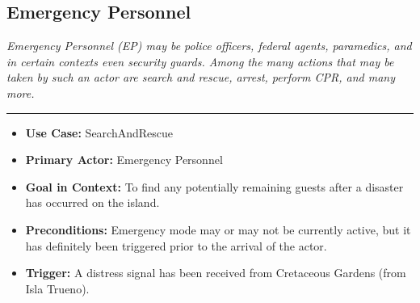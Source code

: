 \documentclass[12pt]{article}
\begin{document}
    \subsection{Emergency Personnel}
    \textit{Emergency Personnel (EP) may be police officers, federal agents, paramedics, and in certain contexts even 
    security guards. Among the many actions that may be taken by such an actor are search and rescue, arrest, perform CPR, 
    and many more.}
    \par\noindent\rule{\textwidth}{0.4pt}    
    \begin{itemize}
        \item[]\textbf{Use Case:}                                
            SearchAndRescue

        \item[]\textbf{Primary Actor:}
            Emergency Personnel

        \item[]\textbf{Goal in Context:}
            To find any potentially remaining guests after a disaster has occurred on the island.
            
        \item[]\textbf{Preconditions:}
            Emergency mode may or may not be currently active, but it has definitely been triggered prior to 
            the arrival of the actor.

        \item[]\textbf{Trigger:}
            A distress signal has been received from Cretaceous Gardens (from Isla Trueno).


\end{itemize}
\end{document}
